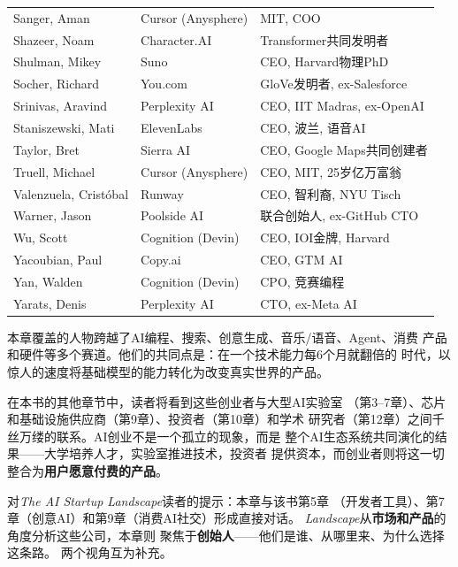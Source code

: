 \begin{keybox}
\begin{tabularx}{\textwidth}{l l X}
Sanger, Aman          & Cursor (Anysphere)   & MIT, COO \\
Shazeer, Noam         & Character.AI         & Transformer共同发明者 \\
Shulman, Mikey        & Suno                 & CEO, Harvard物理PhD \\
Socher, Richard       & You.com              & GloVe发明者, ex-Salesforce \\
Srinivas, Aravind     & Perplexity AI        & CEO, IIT Madras, ex-OpenAI \\
Staniszewski, Mati    & ElevenLabs           & CEO, 波兰, 语音AI \\
Taylor, Bret          & Sierra AI            & CEO, Google Maps共同创建者 \\
Truell, Michael       & Cursor (Anysphere)   & CEO, MIT, 25岁亿万富翁 \\
Valenzuela, Cristóbal & Runway               & CEO, 智利裔, NYU Tisch \\
Warner, Jason         & Poolside AI          & 联合创始人, ex-GitHub CTO \\
Wu, Scott             & Cognition (Devin)    & CEO, IOI金牌, Harvard \\
Yacoubian, Paul       & Copy.ai              & CEO, GTM AI \\
Yan, Walden           & Cognition (Devin)    & CPO, 竞赛编程 \\
Yarats, Denis         & Perplexity AI        & CTO, ex-Meta AI \\
\bottomrule
\end{tabularx}
\end{keybox}

\bigskip

本章覆盖的人物跨越了AI编程、搜索、创意生成、音乐/语音、Agent、消费
产品和硬件等多个赛道。他们的共同点是：在一个技术能力每6个月就翻倍的
时代，以惊人的速度将基础模型的能力转化为改变真实世界的产品。

在本书的其他章节中，读者将看到这些创业者与大型AI实验室
（第3--7章）、芯片和基础设施供应商（第9章）、投资者（第10章）和学术
研究者（第12章）之间千丝万缕的联系。AI创业不是一个孤立的现象，而是
整个AI生态系统共同演化的结果——大学培养人才，实验室推进技术，投资者
提供资本，而创业者则将这一切整合为\textbf{用户愿意付费的产品}。

对\textit{The AI Startup Landscape}读者的提示：本章与该书第5章
（开发者工具）、第7章（创意AI）和第9章（消费AI社交）形成直接对话。
\textit{Landscape}从\textbf{市场和产品}的角度分析这些公司，本章则
聚焦于\textbf{创始人}——他们是谁、从哪里来、为什么选择这条路。
两个视角互为补充。

